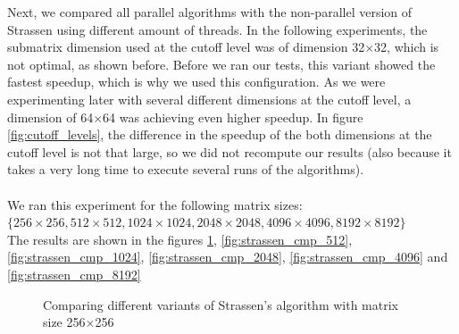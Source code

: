\documentclass{article}
\begin{document}
Next, we compared all parallel algorithms with the non-parallel version of Strassen using different amount of threads. 
In the following experiments, the submatrix dimension used at the cutoff level was of dimension 32$\times$32, which is not optimal, as shown before. 
Before we ran our tests, this variant showed the fastest speedup, which is why we used this configuration.
As we were experimenting later with several different dimensions at the cutoff level, a dimension of 64$\times$64 was achieving even higher speedup.
In figure \ref{fig:cutoff_levels}, the difference in the speedup of the both dimensions at the cutoff
level is not that large, so we did not recompute our results (also because it takes a very long time to execute several runs of the algorithms). \\
\\
We ran this experiment for the following matrix sizes: \\
$\{ 256 \times 256, 512 \times 512, 1024 \times 1024, 2048 \times 2048, 4096 \times 4096, 8192 \times 8192 \}$ \\
The results are shown in the figures \ref{fig:strassen_cmp_256}, \ref{fig:strassen_cmp_512}, \ref{fig:strassen_cmp_1024}, \ref{fig:strassen_cmp_2048}, \ref{fig:strassen_cmp_4096} and \ref{fig:strassen_cmp_8192}


\begin{figure}[h!]
\center
{}
\caption{Comparing different variants of Strassen's algorithm with matrix size 256$\times$256}
\label{fig:strassen_cmp_256}
\end{figure}
\end{document}
